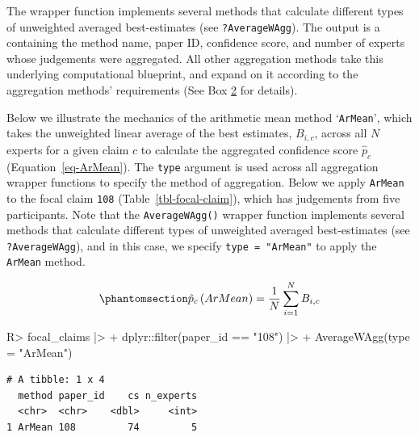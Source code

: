 \documentclass[
  11pt,
  a4paper,
]{article}
\newenvironment{Shaded}{\begin{snugshade}}{\end{snugshade}}
\newcommand{\AttributeTok}[1]{\textcolor[rgb]{0.40,0.45,0.13}{#1}}
\newcommand{\FunctionTok}[1]{\textcolor[rgb]{0.28,0.35,0.67}{#1}}
\newcommand{\NormalTok}[1]{\textcolor[rgb]{0.00,0.23,0.31}{#1}}
\newcommand{\SpecialCharTok}[1]{\textcolor[rgb]{0.37,0.37,0.37}{#1}}
\newcommand{\StringTok}[1]{\textcolor[rgb]{0.13,0.47,0.30}{#1}}
\begin{document}
The  wrapper function implements several methods that
calculate different types of unweighted averaged best-estimates (see
\texttt{?AverageWAgg}). The output is a  containing the
method name, paper ID, confidence score, and number of experts whose
judgements were aggregated. All other aggregation methods take this
underlying computational blueprint, and expand on it according to the
aggregation methods' requirements (See Box \hyperref[aggWorkflow]{2} for
details).

Below we illustrate the mechanics of the arithmetic mean method
`\texttt{ArMean}', which takes the unweighted linear average of the best
estimates, \(B_{i,c}\), across all \(N\) experts for a given claim \(c\)
to calculate the aggregated confidence score \(\hat{p}_c\)
(Equation~\ref{eq-ArMean}). The \texttt{type} argument is used across
all aggregation wrapper functions to specify the method of aggregation.
Below we apply \texttt{ArMean} to the focal claim \texttt{108}
(Table~\ref{tbl-focal-claim}), which has judgements from five
participants. Note that the \texttt{AverageWAgg()} wrapper function
implements several methods that calculate different types of unweighted
averaged best-estimates (see \texttt{?AverageWAgg}), and in this case,
we specify \texttt{type\ =\ "ArMean"} to apply the \texttt{ArMean}
method.

\begin{equation}\protect\phantomsection\label{eq-ArMean}{
\hat{p}_c\left(ArMean \right ) = \frac{1}{N}\sum_{i=1}^N B_{i,c}
}\end{equation}

\begin{Shaded}
\begin{Highlighting}[]
\NormalTok{R}\SpecialCharTok{\textgreater{}}\NormalTok{ focal\_claims }\SpecialCharTok{|\textgreater{}}
\SpecialCharTok{+}\NormalTok{    dplyr}\SpecialCharTok{::}\FunctionTok{filter}\NormalTok{(paper\_id }\SpecialCharTok{==} \StringTok{"108"}\NormalTok{) }\SpecialCharTok{|\textgreater{}}
\SpecialCharTok{+}    \FunctionTok{AverageWAgg}\NormalTok{(}\AttributeTok{type =} \StringTok{"ArMean"}\NormalTok{)}
\end{Highlighting}
\end{Shaded}

\begin{verbatim}
# A tibble: 1 x 4
  method paper_id    cs n_experts
  <chr>  <chr>    <dbl>     <int>
1 ArMean 108         74         5
\end{verbatim}
\end{document}
